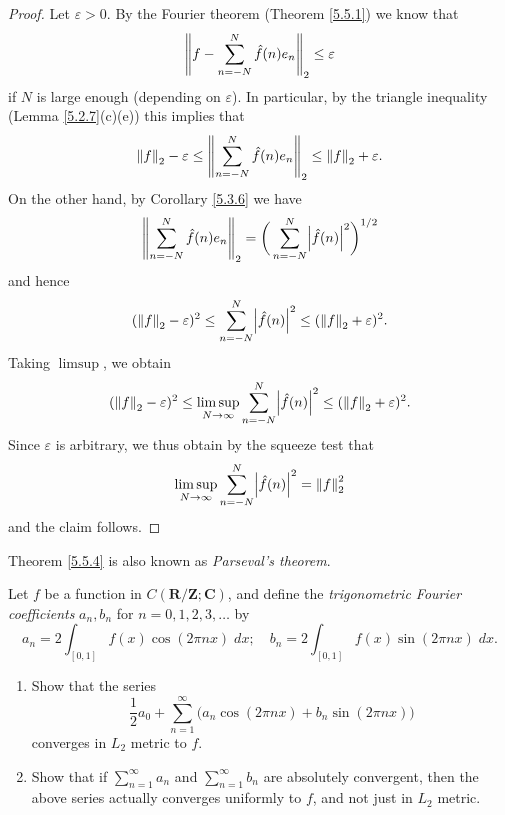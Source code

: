 \begin{proof}
    Let \(\varepsilon > 0\).
    By the Fourier theorem (Theorem \ref{5.5.1}) we know that
    \[
        \norm*{f - \sum_{n = -N}^N \hat{f}(n) e_n}_2 \leq \varepsilon
    \]
    if \(N\) is large enough (depending on \(\varepsilon\)).
    In particular, by the triangle inequality (Lemma \ref{5.2.7}(c)(e)) this implies that
    \[
        \norm*{f}_2 - \varepsilon \leq \norm*{\sum_{n = -N}^N \hat{f}(n) e_n}_2 \leq \norm*{f}_2 + \varepsilon.
    \]
    On the other hand, by Corollary \ref{5.3.6} we have
    \[
        \norm*{\sum_{n = -N}^N \hat{f}(n) e_n}_2 = \bigg(\sum_{n = -N}^N \abs*{\hat{f}(n)}^2\bigg)^{1 / 2}
    \]
    and hence
    \[
        (\norm*{f}_2 - \varepsilon)^2 \leq \sum_{n = -N}^N \abs*{\hat{f}(n)}^2 \leq (\norm*{f}_2 + \varepsilon)^2.
    \]
    Taking \(\limsup\), we obtain
    \[
        (\norm*{f}_2 - \varepsilon)^2 \leq \limsup_{N \to \infty} \sum_{n = -N}^N \abs*{\hat{f}(n)}^2 \leq (\norm*{f}_2 + \varepsilon)^2.
    \]
    Since \(\varepsilon\) is arbitrary, we thus obtain by the squeeze test that
    \[
        \limsup_{N \to \infty} \sum_{n = -N}^N \abs*{\hat{f}(n)}^2 = \norm*{f}_2^2
    \]
    and the claim follows.
\end{proof}

\begin{note}
    Theorem \ref{5.5.4} is also known as \emph{Parseval's theorem}.
\end{note}

\exercisesection

\begin{exercise}\label{ex 5.5.1}
    Let \(f\) be a function in \(C(\mathbf{R} / \mathbf{Z} ; \mathbf{C})\), and define the \emph{trigonometric Fourier coefficients} \(a_n, b_n\) for \(n = 0, 1, 2, 3, \dots\) by
    \[
        a_n = 2 \int_{[0, 1]} f(x) \cos(2 \pi n x) \; dx; \quad b_n = 2 \int_{[0, 1]} f(x) \sin(2 \pi n x) \; dx.
    \]
    \begin{enumerate}
        \item Show that the series
              \[
                  \frac{1}{2} a_0 + \sum_{n = 1}^\infty \big(a_n \cos(2 \pi n x) + b_n \sin(2 \pi n x)\big)
              \]
              converges in \(L_2\) metric to \(f\).
        \item Show that if \(\sum_{n = 1}^\infty a_n\) and \(\sum_{n = 1}^\infty b_n\) are absolutely convergent, then the above series actually converges uniformly to \(f\), and not just in \(L_2\) metric.
    \end{enumerate}
\end{exercise}

